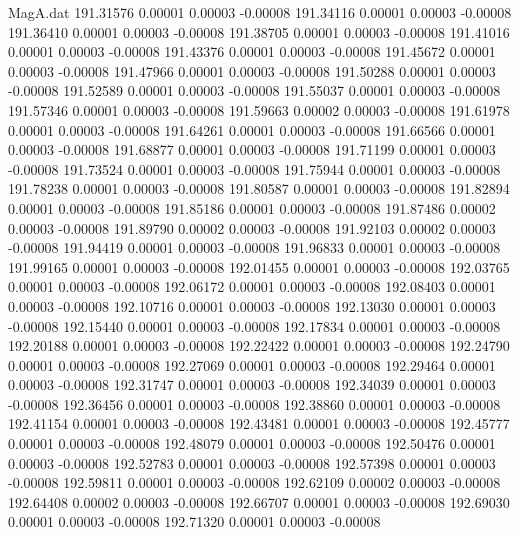 \begin{filecontents}{MagA.dat}
 191.31576    0.00001    0.00003   -0.00008
 191.34116    0.00001    0.00003   -0.00008
 191.36410    0.00001    0.00003   -0.00008
 191.38705    0.00001    0.00003   -0.00008
 191.41016    0.00001    0.00003   -0.00008
 191.43376    0.00001    0.00003   -0.00008
 191.45672    0.00001    0.00003   -0.00008
 191.47966    0.00001    0.00003   -0.00008
 191.50288    0.00001    0.00003   -0.00008
 191.52589    0.00001    0.00003   -0.00008
 191.55037    0.00001    0.00003   -0.00008
 191.57346    0.00001    0.00003   -0.00008
 191.59663    0.00002    0.00003   -0.00008
 191.61978    0.00001    0.00003   -0.00008
 191.64261    0.00001    0.00003   -0.00008
 191.66566    0.00001    0.00003   -0.00008
 191.68877    0.00001    0.00003   -0.00008
 191.71199    0.00001    0.00003   -0.00008
 191.73524    0.00001    0.00003   -0.00008
 191.75944    0.00001    0.00003   -0.00008
 191.78238    0.00001    0.00003   -0.00008
 191.80587    0.00001    0.00003   -0.00008
 191.82894    0.00001    0.00003   -0.00008
 191.85186    0.00001    0.00003   -0.00008
 191.87486    0.00002    0.00003   -0.00008
 191.89790    0.00002    0.00003   -0.00008
 191.92103    0.00002    0.00003   -0.00008
 191.94419    0.00001    0.00003   -0.00008
 191.96833    0.00001    0.00003   -0.00008
 191.99165    0.00001    0.00003   -0.00008
 192.01455    0.00001    0.00003   -0.00008
 192.03765    0.00001    0.00003   -0.00008
 192.06172    0.00001    0.00003   -0.00008
 192.08403    0.00001    0.00003   -0.00008
 192.10716    0.00001    0.00003   -0.00008
 192.13030    0.00001    0.00003   -0.00008
 192.15440    0.00001    0.00003   -0.00008
 192.17834    0.00001    0.00003   -0.00008
 192.20188    0.00001    0.00003   -0.00008
 192.22422    0.00001    0.00003   -0.00008
 192.24790    0.00001    0.00003   -0.00008
 192.27069    0.00001    0.00003   -0.00008
 192.29464    0.00001    0.00003   -0.00008
 192.31747    0.00001    0.00003   -0.00008
 192.34039    0.00001    0.00003   -0.00008
 192.36456    0.00001    0.00003   -0.00008
 192.38860    0.00001    0.00003   -0.00008
 192.41154    0.00001    0.00003   -0.00008
 192.43481    0.00001    0.00003   -0.00008
 192.45777    0.00001    0.00003   -0.00008
 192.48079    0.00001    0.00003   -0.00008
 192.50476    0.00001    0.00003   -0.00008
 192.52783    0.00001    0.00003   -0.00008
 192.57398    0.00001    0.00003   -0.00008
 192.59811    0.00001    0.00003   -0.00008
 192.62109    0.00002    0.00003   -0.00008
 192.64408    0.00002    0.00003   -0.00008
 192.66707    0.00001    0.00003   -0.00008
 192.69030    0.00001    0.00003   -0.00008
 192.71320    0.00001    0.00003   -0.00008

\end{filecontents}
